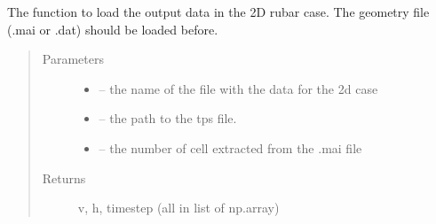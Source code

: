 \documentclass[letterpaper,10pt,english]{sphinxmanual}
\begin{document}
\begin{fulllineitems}
\label{\detokenize{index:src.rubar.load_tps_2d}}
The function to load the output data in the 2D rubar case. The geometry file (.mai or .dat) should be loaded before.
\begin{quote}\begin{description}
\item[{Parameters}] \leavevmode\begin{itemize}
\item {} 
 -- the name of the file with the data for the 2d case

\item {} 
 -- the path to the tps file.

\item {} 
 -- the number of cell extracted from the .mai file

\end{itemize}

\item[{Returns}] \leavevmode
v, h, timestep (all in list of np.array)

\end{description}\end{quote}

\end{fulllineitems}

\end{document}
